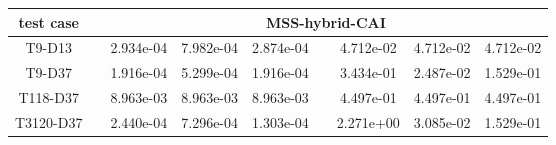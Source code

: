 \begin{table}[h]
\begin{adjustbox}{width=1\textwidth} %
\small
\begin{tabular}{ccccccccc}
\toprule
{test case} && \multicolumn{7}{c}{MSS-hybrid-CAI}   \\
\midrule
T9-D13       &&  2.934e-04 &  7.982e-04 &  2.874e-04 &&  4.712e-02 &  4.712e-02 &  4.712e-02 \\
T9-D37       &&  1.916e-04 &  5.299e-04 &  1.916e-04 &&  3.434e-01 &  2.487e-02 &  1.529e-01 \\
T118-D37     &&  8.963e-03 &  8.963e-03 &  8.963e-03 &&  4.497e-01 &  4.497e-01 &  4.497e-01 \\
T3120-D37    &&  2.440e-04 &  7.296e-04 &  1.303e-04 &&  2.271e+00 &  3.085e-02 &  1.529e-01 \\
\bottomrule
\end{tabular}
\end{adjustbox}


\end{table}

